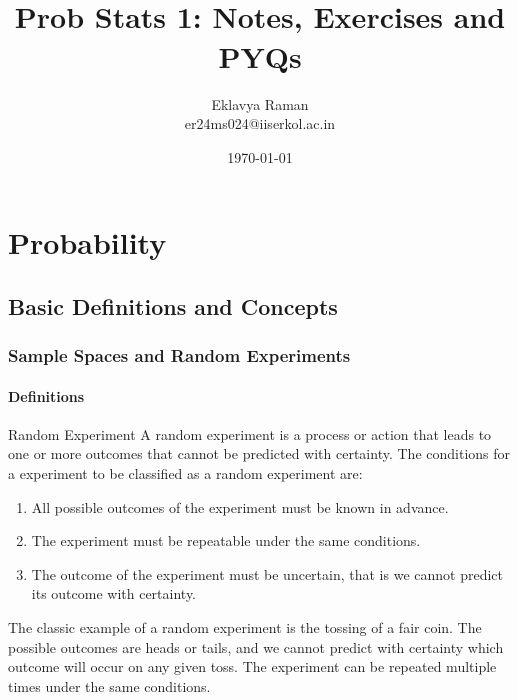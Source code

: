 \documentclass[openany]{book}
\begin{document}
\title{\Large{} \\ \vspace{5pt}
\large{Prob Stats 1: Notes, Exercises and PYQs}}
\author{Eklavya Raman \\ \vspace{5pt} er24ms024@iiserkol.ac.in \\ \vspace{5pt}}
\date{\today}
\maketitle
\tableofcontents
\listoftheorems[
    show=mytheorem,
    title={List of Theorems}]
\part{Probability}
\chapter{Basic Definitions and Concepts}
\section{Sample Spaces and Random Experiments}
\subsection{Definitions}
\begin{mydefinition}{Random Experiment}
A random experiment is a process or action that leads to one or more outcomes that cannot be predicted with certainty. The conditions for a experiment to be classified as a random experiment are: 

\begin{enumerate}
    \item All possible outcomes of the experiment must be known in advance.
    \item The experiment must be repeatable under the same conditions.
    \item The outcome of the experiment must be uncertain, that is we cannot predict its outcome with certainty.
\end{enumerate}
\end{mydefinition}
\begin{example}
    The classic example of a random experiment is the tossing of a fair coin. The possible outcomes are heads or tails, and we cannot predict with certainty which outcome will occur on any given toss. The experiment can be repeated multiple times under the same conditions. 
\end{example}
\end{document}
